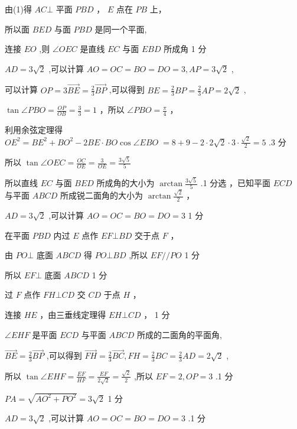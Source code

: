 \documentclass[10pt]{article}
\newcommand*\circled[1]{\tikz[baseline=(char.base)]{\node[shape=circle,draw,inner sep=1.5pt] (char) {\small #1};}}
\begin{document}
由(1)得 \({AC} \bot\) 平面 \({PBD}\) ， \(E\) 点在 \({PB}\) 上，

所以面 \({BED}\) 与面 \({PBD}\) 是同一个平面,

连接 \({EO}\) ,则 \(\angle {OEC}\) 是直线 \({EC}\) 与面 \({EBD}\) 所成角 1 分

\({AD} = 3\sqrt{2}\) ,可以计算 \({AO} = {OC} = {BO} = {DO} = 3,{AP} = 3\sqrt{2}\) ,

可以计算 \({OP} = 3\overrightarrow{BE} = \frac{2}{3}\overrightarrow{BP}\) ,可以得到 \({BE} = \frac{2}{3}{BP} = \frac{2}{3}{AP} = 2\sqrt{2}\) ,

\(\tan \angle {PBO} = \frac{OP}{OB} = \frac{3}{3} = 1\) ，所以 \(\angle {PBO} = \frac{\pi }{4}\) ，

利用余弦定理得 \(O{E}^{2} = B{E}^{2} + B{O}^{2} - {2BE} \cdot  {BO}\cos \angle {EBO} \; = 8 + 9 - 2 \cdot  2\sqrt{2} \cdot  3 \cdot  \frac{\sqrt{2}}{2} = 5\) .3 分

所以 \(\tan \angle {OEC} = \frac{OC}{OE} = \frac{3}{OE} = \frac{3\sqrt{5}}{5}\)

所以直线 \({EC}\) 与面 \({BED}\) 所成角的大小为 \(\arctan \frac{3\sqrt{5}}{5}\) .1 分选 \circled{2} ，已知平面 \({ECD}\) 与平面 \({ABCD}\) 所成锐二面角的大小为 \(\arctan \frac{\sqrt{2}}{2}\) ，

\({AD} = 3\sqrt{2}\) ,可以计算 \({AO} = {OC} = {BO} = {DO} = 3\) 1 分

在平面 \({PBD}\) 内过 \(E\) 点作 \({EF} \bot  {BD}\) 交于点 \(F\) ，

由 \({PO} \bot\) 底面 \({ABCD}\) 得 \({PO} \bot  {BD}\) ,所以 \({EF}//{PO}\) 1 分

所以 \({EF} \bot\) 底面 \({ABCD}\) 1 分

过 \(F\) 点作 \({FH} \bot  {CD}\) 交 \({CD}\) 于点 \(H\) ，

连接 \({HE}\) ，由三垂线定理得 \({EH} \bot  {CD}\) ， 1 分

\(\angle {EHF}\) 是平面 \({ECD}\) 与平面 \({ABCD}\) 所成的二面角的平面角,

\(\overrightarrow{BE} = \frac{2}{3}\overrightarrow{BP}\) ,可以得到 \(\overrightarrow{FH} = \frac{2}{3}\overrightarrow{BC},{FH} = \frac{2}{3}{BC} = \frac{2}{3}{AD} = 2\sqrt{2}\) ,

所以 \(\tan \angle {EHF} = \frac{EF}{HF} = \frac{EF}{2\sqrt{2}} = \frac{\sqrt{2}}{2}\) ,所以 \({EF} = 2,{OP} = 3\) .1 分

\({PA} = \sqrt{A{O}^{2} + P{O}^{2}} = 3\sqrt{2}\) 1 分

\({AD} = 3\sqrt{2}\) ,可以计算 \({AO} = {OC} = {BO} = {DO} = 3\) .1 分
\end{document}
